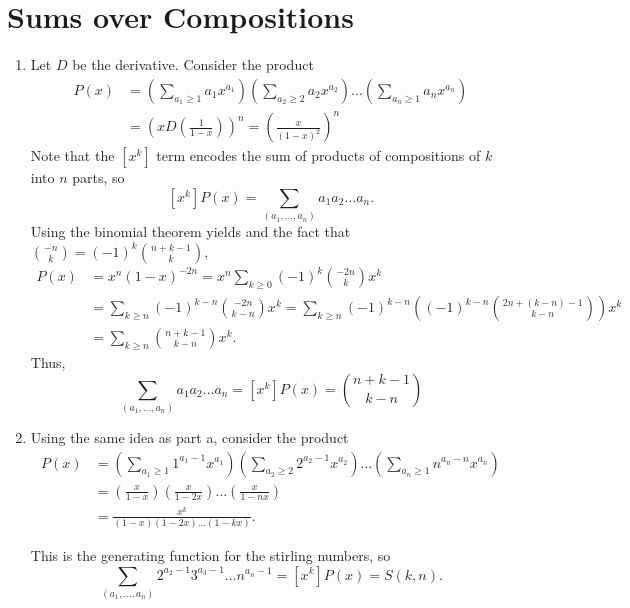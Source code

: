 \documentclass{article}
\begin{document}
\section{Sums over Compositions}
      \begin{enumerate}
         \item Let $D$ be the derivative.
            Consider the product 
            \begin{align*}
               P(x) &= \left(\sum_{a_1 \geq 1} a_1x^{a_1}\right)
                       \left(\sum_{a_2 \geq 2} a_2x^{a_2}\right)\hdots 
                       \left(\sum_{a_n \geq 1} a_nx^{a_n}\right) \\
                    &= \left(xD\left(\frac{1}{1-x}\right)\right)^n 
                     = \left(\frac{x}{(1-x)^2}\right)^n
            \end{align*}
            Note that the $[x^k]$ term encodes the sum of products of
            compositions of $k$ into $n$ parts, so
            \[
               [x^k]P(x) = \sum_{(a_1,\hdots,a_n)} a_1a_2\hdots a_n.
            \]   
            Using the binomial theorem yields and the fact that
            $\binom{-n}{k} = (-1)^k\binom{n+k-1}{k}$,
            \begin{align*}
               P(x) &=  x^n(1-x)^{-2n} = x^n \sum_{k \geq 0} (-1)^{k} \binom{-2n}{k} x^k \\
                    &= \sum_{k \geq n} (-1)^{k-n}\binom{-2n}{k-n} x^k = \sum_{k \geq n} (-1)^{k-n}\left((-1)^{k-n} \binom{2n+(k-n)-1}{k-n}\right) x^k \\
                    &= \sum_{k \geq n} \binom{n+k-1}{k-n} x^k.
            \end{align*}
            Thus,
            \[
               \sum_{(a_1,\hdots,a_n)} a_1a_2\hdots a_n 
               = [x^k]P(x)
               = \binom{n+k-1}{k-n}
            \]
         \item Using the same idea as part a, consider the product 
         \begin{align*}
            P(x) &= \left(\sum_{a_1 \geq 1} 1^{a_1-1}x^{a_1}\right)
                    \left(\sum_{a_2 \geq 2} 2^{a_2-1}x^{a_2}\right)\hdots 
                    \left(\sum_{a_n \geq 1} n^{a_n-n}x^{a_n}\right) \\
                 &= \left(\frac{x}{1-x}\right)
                    \left(\frac{x}{1-2x}\right)\hdots 
                    \left(\frac{x}{1-nx}\right) \\ 
                 &= \frac{x^k}{(1-x)(1-2x)\hdots(1-kx)}.
         \end{align*}

         This is the generating function for the stirling numbers, so
         \[
            \sum_{(a_1,\hdots,a_n)}2^{a_2-1}3^{a_3-1}\hdots n^{a_n-1}
            = [x^k]P(x) = S(k,n).
         \] 
      \end{enumerate}
\newpage 
\end{document}
